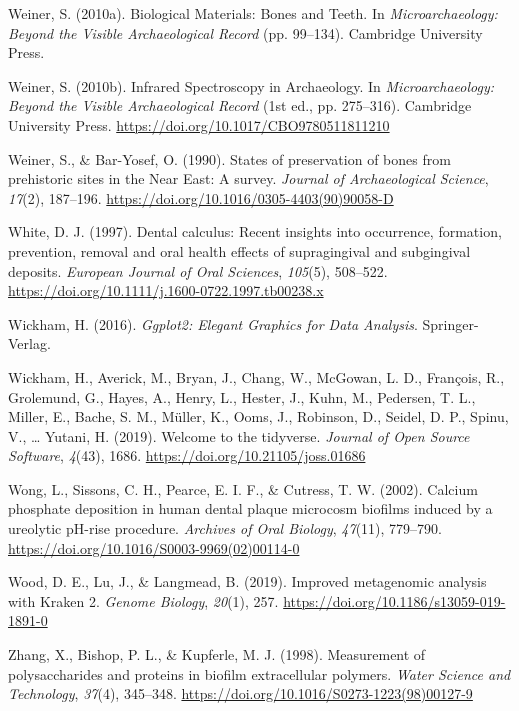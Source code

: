 \documentclass[
  b5paper,
]{book}
\newlength{\cslhangindent}
\newlength{\cslentryspacingunit} %
\newenvironment{CSLReferences}[2] %
 {%
  \setlength{\parindent}{0pt}
  \ifodd #1
  \let\oldpar\par
  \def\par{\hangindent=\cslhangindent\oldpar}
  \fi
  \setlength{\parskip}{#2\cslentryspacingunit}
 }%
 {}
\begin{document}
\begin{CSLReferences}{1}{0}
\leavevmode{}%
Weiner, S. (2010a). Biological {Materials}: {Bones} and {Teeth}. In
\emph{Microarchaeology: {Beyond} the {Visible Archaeological Record}}
(pp. 99--134). {Cambridge University Press}.

\leavevmode{}%
Weiner, S. (2010b). Infrared {Spectroscopy} in {Archaeology}. In
\emph{Microarchaeology: {Beyond} the {Visible Archaeological Record}}
(1st ed., pp. 275--316). {Cambridge University Press}.
\url{https://doi.org/10.1017/CBO9780511811210}

\leavevmode{}%
Weiner, S., \& Bar-Yosef, O. (1990). States of preservation of bones
from prehistoric sites in the {Near East}: {A} survey. \emph{Journal of
Archaeological Science}, \emph{17}(2), 187--196.
\url{https://doi.org/10.1016/0305-4403(90)90058-D}

\leavevmode{}%
White, D. J. (1997). Dental calculus: Recent insights into occurrence,
formation, prevention, removal and oral health effects of supragingival
and subgingival deposits. \emph{European Journal of Oral Sciences},
\emph{105}(5), 508--522.
\url{https://doi.org/10.1111/j.1600-0722.1997.tb00238.x}

\leavevmode{}%
Wickham, H. (2016). \emph{Ggplot2: {Elegant Graphics} for {Data
Analysis}}. {Springer-Verlag}.

\leavevmode{}%
Wickham, H., Averick, M., Bryan, J., Chang, W., McGowan, L. D.,
François, R., Grolemund, G., Hayes, A., Henry, L., Hester, J., Kuhn, M.,
Pedersen, T. L., Miller, E., Bache, S. M., Müller, K., Ooms, J.,
Robinson, D., Seidel, D. P., Spinu, V., \ldots{} Yutani, H. (2019).
Welcome to the {tidyverse}. \emph{Journal of Open Source Software},
\emph{4}(43), 1686. \url{https://doi.org/10.21105/joss.01686}

\leavevmode{}%
Wong, L., Sissons, C. H., Pearce, E. I. F., \& Cutress, T. W. (2002).
Calcium phosphate deposition in human dental plaque microcosm biofilms
induced by a ureolytic {pH-rise} procedure. \emph{Archives of Oral
Biology}, \emph{47}(11), 779--790.
\url{https://doi.org/10.1016/S0003-9969(02)00114-0}

\leavevmode{}%
Wood, D. E., Lu, J., \& Langmead, B. (2019). Improved metagenomic
analysis with {Kraken} 2. \emph{Genome Biology}, \emph{20}(1), 257.
\url{https://doi.org/10.1186/s13059-019-1891-0}

\leavevmode{}%
Zhang, X., Bishop, P. L., \& Kupferle, M. J. (1998). Measurement of
polysaccharides and proteins in biofilm extracellular polymers.
\emph{Water Science and Technology}, \emph{37}(4), 345--348.
\url{https://doi.org/10.1016/S0273-1223(98)00127-9}

\end{CSLReferences}
\end{document}
